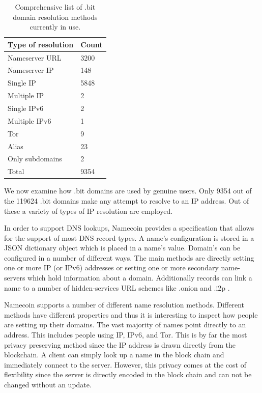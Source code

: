 \begin{table}[t]
\centering
\begin{tabular}{ll}
Type of resolution & Count \\ \hline
Nameserver URL     & 3200  \\
Nameserver IP      & 148   \\
Single IP          & 5848  \\
Multiple IP        & 2     \\
Single IPv6        & 2     \\
Multiple IPv6      & 1     \\
Tor                & 9    \\
Alias              & 23    \\
Only subdomains    & 2   \\ \hline
Total              & 9354
\end{tabular}
\caption{Comprehensive list of .bit domain resolution methods currently in use.}
\end{table}

We now examine how .bit domains are used by genuine users. Only 9354 out of the 119624 .bit domains make any attempt to resolve to an IP address. Out of these a variety of types of IP resolution are employed.

In order to support DNS lookups, Namecoin provides a specification that allows for the support of most DNS record types. A name's configuration is stored in a JSON dictionary object which is placed in a name's value. Domain's can be configured in a number of different ways. The main methods are directly setting one or more IP (or IPv6) addresses or setting one or more secondary name-servers which hold information about a domain. Additionally records can link a name to a number of hidden-services URL schemes like .onion \cite{onion} and .i2p \cite{i2p}.

Namecoin supports a number of different name resolution methods. Different methods have different properties and thus it is interesting to inspect how people are setting up their domains. The vast majority of names point directly to an address. This includes people using IP, IPv6, and Tor. This is by far the most privacy preserving method since the IP address is drawn directly from the blockchain. A client can simply look up a name in the block chain and immediately connect to the server. However, this privacy comes at the cost of flexibility since the server is directly encoded in the block chain and can not be changed without an update.


